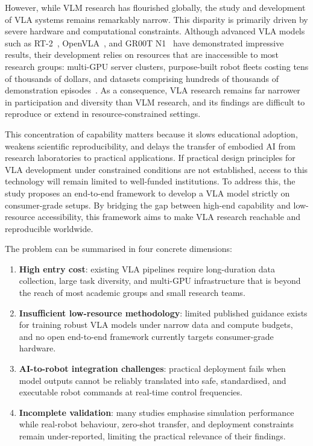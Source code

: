 However, while VLM research has flourished globally, the study and development of
VLA systems remains remarkably narrow. This disparity is primarily driven by severe
hardware and computational constraints. Although advanced VLA models such as
RT-2~\cite{brohan2023rt2}, OpenVLA~\cite{kim2024openvla}, and GR00T N1~\cite{nvidia2024groot} have demonstrated impressive results, their
development relies on resources that are inaccessible to most research groups:
multi-GPU server clusters, purpose-built robot fleets costing tens of thousands of
dollars, and datasets comprising hundreds of thousands of demonstration
episodes~\cite{openx2023, khazatsky2024droid}. As a consequence, VLA research
remains far narrower in participation and diversity than VLM research, and its
findings are difficult to reproduce or extend in resource-constrained settings.

This concentration of capability matters because it slows educational adoption,
weakens scientific reproducibility, and delays the transfer of embodied AI from
research laboratories to practical applications. If practical design principles for
VLA development under constrained conditions are not established, access to this
technology will remain limited to well-funded institutions. To address this, the
study proposes an end-to-end framework to develop a VLA model strictly on
consumer-grade setups. By bridging the gap between high-end capability and
low-resource accessibility, this framework aims to make VLA research reachable and
reproducible worldwide.

\newpage

\noindent The problem can be summarised in four concrete dimensions:

\begin{enumerate}
    \item \textbf{High entry cost}: existing VLA pipelines require long-duration data
    collection, large task diversity, and multi-GPU infrastructure that is beyond the
    reach of most academic groups and small research teams.

    \item \textbf{Insufficient low-resource methodology}: limited published guidance
    exists for training robust VLA models under narrow data and compute budgets, and
    no open end-to-end framework currently targets consumer-grade hardware.

    \item \textbf{AI-to-robot integration challenges}: practical deployment fails when
    model outputs cannot be reliably translated into safe, standardised, and
    executable robot commands at real-time control frequencies.

    \item \textbf{Incomplete validation}: many studies emphasise simulation
    performance while real-robot behaviour, zero-shot transfer, and deployment
    constraints remain under-reported, limiting the practical relevance of their
    findings.
\end{enumerate}

